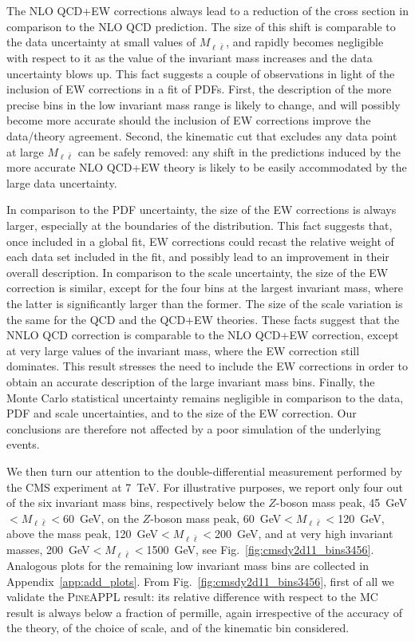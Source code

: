 The NLO QCD+EW corrections always lead to a reduction of the cross section in
comparison to the NLO QCD prediction. The size of this shift is comparable to
the data uncertainty at small values of $M_{\ell\bar\ell}$, and rapidly becomes
negligible with respect to it as the value of the invariant mass increases
and the data uncertainty blows up. This fact suggests a couple of observations
in light of the inclusion of EW corrections in a fit of PDFs. First, the
description of the more precise bins in the low invariant mass range is likely
to change, and will possibly become more accurate should the inclusion of EW
corrections improve the data/theory agreement. Second, the kinematic cut that
excludes any data point at large $M_{\ell\bar\ell}$ can be safely removed: any
shift in the predictions induced by the more accurate NLO QCD+EW theory is
likely to be easily accommodated by the large data uncertainty.

In comparison to the PDF uncertainty, the size of the EW corrections is
always larger, especially at the boundaries of the distribution. This fact
suggests that, once included in a global fit, EW corrections could recast the
relative weight of each data set included in the fit, and possibly lead to
an improvement in their overall description. In comparison to the scale
uncertainty, the size of the EW correction is similar, except for the four bins
at the largest invariant mass, where the latter is significantly larger than
the former. The size of the scale variation is the same for the QCD and the
QCD+EW theories. These facts suggest that the NNLO QCD correction is comparable
to the NLO QCD+EW correction, except at very large values of the invariant mass,
where the EW correction still dominates. This result stresses the need to
include the EW corrections in order to obtain an accurate description of the
large invariant mass bins. Finally, the Monte Carlo statistical
uncertainty remains negligible in comparison to the data, PDF and scale
uncertainties, and to the size of the EW correction. Our conclusions are
therefore not affected by a poor simulation of the underlying events.

We then turn our attention to the double-differential measurement performed by
the CMS experiment at 7~TeV. For illustrative purposes, we report only four out
of the six invariant mass bins, respectively below the $Z$-boson mass peak,
45~GeV$<M_{\ell\bar\ell}<$60~GeV, on the $Z$-boson mass peak,
60~GeV$<M_{\ell\bar\ell}<$120~GeV, above the mass peak,
120~GeV$<M_{\ell\bar\ell}<$200~GeV, and at very high invariant masses,
200~GeV$<M_{\ell\bar\ell}<$1500~GeV, see Fig.~\ref{fig:cmsdy2d11_bins3456}.
Analogous plots for the remaining low invariant mass bins are collected in
Appendix~\ref{app:add_plots}. From Fig.~\ref{fig:cmsdy2d11_bins3456},
first of all we validate the \textsc{PineAPPL} result: its relative difference
with respect to the \textsc{MC} result is always below a fraction of permille,
again irrespective of the accuracy of the theory, of the choice of scale, and
of the kinematic bin considered. 


